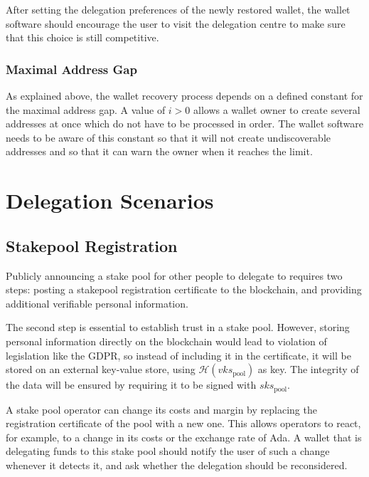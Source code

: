 \documentclass[11pt,a4paper]{article}
\begin{document}
After setting the delegation preferences of the newly restored wallet,
the wallet software should encourage the user to visit the delegation
centre to make sure that this choice is still competitive.

\subsubsection{Maximal Address Gap}
\label{maximal-address-gap}

As explained above, the wallet recovery process depends on a defined
constant for the maximal address gap. A value of \(i>0\) allows a wallet
owner to create several addresses at once which do not have to be
processed in order. The wallet software needs to be aware of this
constant so that it will not create undiscoverable addresses and so that
it can warn the owner when it reaches the limit.

\section{Delegation Scenarios}
\label{delegation-scenarios}

\subsection{Stakepool Registration}
\label{stakepool-registration}

Publicly announcing a stake pool for other people to delegate to
requires two steps: posting a stakepool registration certificate to the
blockchain, and providing additional verifiable personal information.

The second step is essential to establish trust in a stake pool.
However, storing personal information directly on the blockchain would
lead to violation of legislation like the GDPR, so instead of including
it in the certificate, it will be stored on an external key-value store,
using \(\mathcal{H}(vks_\text{pool})\) as key. The integrity of the data
will be ensured by requiring it to be signed with \(sks_\text{pool}\).

A stake pool operator can change its costs and margin by replacing the
registration certificate of the pool with a new one. This allows
operators to react, for example, to a change in its costs or the
exchange rate of Ada. A wallet that is delegating funds to this stake
pool should notify the user of such a change whenever it detects it, and
ask whether the delegation should be reconsidered.
\end{document}
